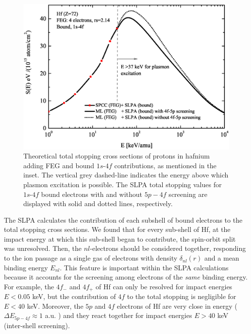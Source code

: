 \documentclass[aps,pra,reprint,groupedaddress]{revtex4-1}
\begin{document}
\begin{figure}[!t]
\centering
\includegraphics[width=13.cm]{Fig02.eps}
\caption{Theoretical total stopping cross sections of protons in hafnium adding FEG and bound $1s$-$4f$ contributions, as mentioned in the inset. The vertical grey dashed-line indicates the energy above which plasmon excitation is possible. %
The SLPA total stopping values for $1s$-$4f$ bound electrons with and without $5p-4f$ screening are displayed with solid and dotted lines, respectively.}
\label{slpa4f}
\end{figure}

The SLPA calculates the contribution of each subshell of bound electrons to the total stopping cross sections. We found that for every sub-shell of Hf, at the impact energy at which this sub-shell began to contribute, the spin-orbit split was unresolved.  Then, the $nl$-electrons should be considered together, responding to the ion passage as a single gas of electrons with density $\delta_{nl}(r)$ and a mean binding energy $E_{nl}$. This feature is important within the SLPA calculations because it accounts for the screening among electrons of the \textit{same} binding energy. For example, the $4f_{-}$ and $4f_{+}$ of Hf can only be resolved for impact energies $E<0.05$ keV, but the contribution of $4f$ to the total stopping is negligible for $E<40$ keV. Moreover, the $5p$ and $4f$ electrons of Hf are very close in energy ( $\Delta E_{5p-4f} \approx 1$ a.u. \cite{mendez2019}) %
and they react together for impact energies $E>40$ keV (inter-shell screening).
\end{document}
